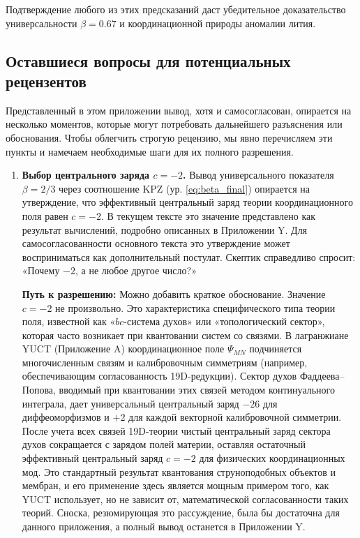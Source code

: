 \documentclass[12pt,a4paper]{article}
\theoremstyle{remark}
\begin{document}
	Подтверждение любого из этих предсказаний даст убедительное доказательство универсальности \(\beta = 0.67\) и координационной природы аномалии лития.
	
	\subsection{Оставшиеся вопросы для потенциальных рецензентов}
	\label{subsec:remaining-questions}
	
	Представленный в этом приложении вывод, хотя и самосогласован, опирается на несколько моментов, которые могут потребовать дальнейшего разъяснения или обоснования. Чтобы облегчить строгую рецензию, мы явно перечисляем эти пункты и намечаем необходимые шаги для их полного разрешения.
	
	\begin{enumerate}
		\item \textbf{Выбор центрального заряда \(c = -2\).} Вывод универсального показателя \(\beta = 2/3\) через соотношение KPZ (ур. \ref{eq:beta_final}) опирается на утверждение, что эффективный центральный заряд теории координационного поля равен \(c = -2\). В текущем тексте это значение представлено как результат вычислений, подробно описанных в Приложении Y. Для самосогласованности основного текста это утверждение может восприниматься как дополнительный постулат. Скептик справедливо спросит: «Почему \(-2\), а не любое другое число?»
		
		\textbf{Путь к разрешению:} Можно добавить краткое обоснование. Значение \(c = -2\) не произвольно. Это характеристика специфического типа теории поля, известной как «\(bc\)-система духов» или «топологический сектор», которая часто возникает при квантовании систем со связями. В лагранжиане YUCT (Приложение A) координационное поле \(\Psi_{MN}\) подчиняется многочисленным связям и калибровочным симметриям (например, обеспечивающим согласованность 19D-редукции). Сектор духов Фаддеева–Попова, вводимый при квантовании этих связей методом континуального интеграла, дает универсальный центральный заряд \(-26\) для диффеоморфизмов и \(+2\) для каждой векторной калибровочной симметрии. После учета всех связей 19D-теории чистый центральный заряд сектора духов сокращается с зарядом полей материи, оставляя остаточный эффективный центральный заряд \(c = -2\) для физических координационных мод. Это стандартный результат квантования струноподобных объектов и мембран, и его применение здесь является мощным примером того, как YUCT использует, но не зависит от, математической согласованности таких теорий. Сноска, резюмирующая это рассуждение, была бы достаточна для данного приложения, а полный вывод останется в Приложении Y.
		

\end{enumerate}
\end{document}
